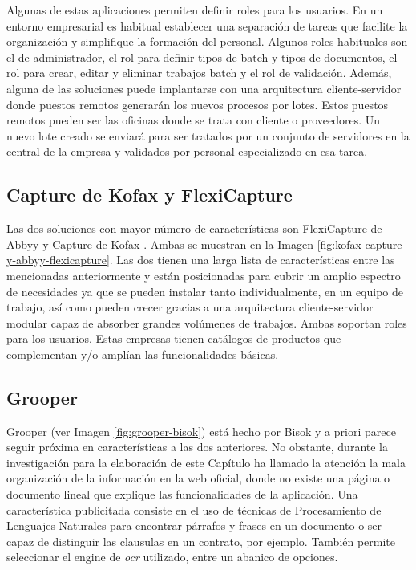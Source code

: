 Algunas de estas aplicaciones permiten definir roles para los usuarios. En un entorno empresarial es habitual establecer una separación de tareas que facilite la organización y simplifique la formación del personal. Algunos roles habituales son el de administrador, el rol para definir tipos de batch y tipos de documentos, el rol para crear, editar y eliminar trabajos batch y el rol de validación. Además, alguna de las soluciones puede implantarse con una arquitectura cliente-servidor donde puestos remotos generarán los nuevos procesos por lotes. Estos puestos remotos pueden ser las oficinas donde se trata con cliente o proveedores. Un nuevo lote creado se enviará para ser tratados por un conjunto de servidores en la central de la empresa y validados por personal especializado en esa tarea.

\subsection{Capture de Kofax y FlexiCapture}

Las dos soluciones con mayor número de características son FlexiCapture de Abbyy \cite{solucionesComerciales_abbyy_flexicapture4invoices} y Capture de Kofax \cite{solucionesComerciales_kofax_capture}. Ambas se muestran en la Imagen \ref{fig:kofax-capture-y-abbyy-flexicapture}. Las dos tienen una larga lista de características entre las mencionadas anteriormente y están posicionadas para cubrir un amplio espectro de necesidades ya que se pueden instalar tanto individualmente, en un equipo de trabajo, así como pueden crecer gracias a una arquitectura cliente-servidor modular capaz de absorber grandes volúmenes de trabajos. Ambas soportan roles para los usuarios. Estas empresas tienen catálogos de productos que complementan y/o amplían las funcionalidades básicas.

\subsection{Grooper}

Grooper \cite{solucionesComerciales_bisok_grooper} (ver Imagen \ref{fig:grooper-bisok}) está hecho por Bisok y a priori parece seguir próxima en características a las dos anteriores. No obstante, durante la investigación para la elaboración de este Capítulo ha llamado la atención la mala organización de la información en la web oficial, donde no existe una página o documento lineal que explique las funcionalidades de la aplicación. Una característica publicitada consiste en el uso de técnicas de Procesamiento de Lenguajes Naturales para encontrar párrafos y frases en un documento o ser capaz de distinguir las clausulas en un contrato, por ejemplo. También permite seleccionar el engine de \emph{\acrlong{ocr}} utilizado, entre un abanico de opciones.


